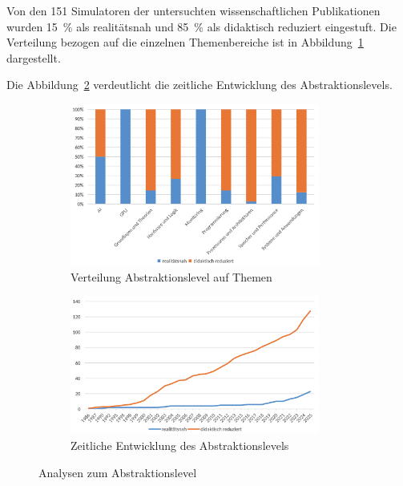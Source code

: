 Von den 151 Simulatoren der untersuchten wissenschaftlichen Publikationen wurden 15~\% als realitätsnah und 85~\% als didaktisch reduziert eingestuft. Die Verteilung bezogen auf die einzelnen Themenbereiche ist in Abbildung~\ref{fig:7-abstraktion-themen} dargestellt.

Die Abbildung~\ref{fig:8-abstraktion-jahr} verdeutlicht die zeitliche Entwicklung des Abstraktionslevels.

\begin{figure}[!htbp]
    \centering
    \begin{subfigure}[b]{0.48\textwidth}
        \centering
        \includegraphics[width=0.90\textwidth]{graphics_lit/7-abtraktion-themen.png}
        \caption{Verteilung Abstraktionslevel auf Themen}
        \label{fig:7-abstraktion-themen}
    \end{subfigure}
    \hfill
    \begin{subfigure}[b]{0.48\textwidth}
        \centering
        \includegraphics[width=0.90\textwidth]{graphics_lit/8-abstraktion-jahr.png}
        \caption{Zeitliche Entwicklung des Abstraktionslevels}
        \label{fig:8-abstraktion-jahr}
    \end{subfigure}
    \caption{Analysen zum Abstraktionslevel}
    \label{fig:abstaktion-analysen}
\end{figure}

